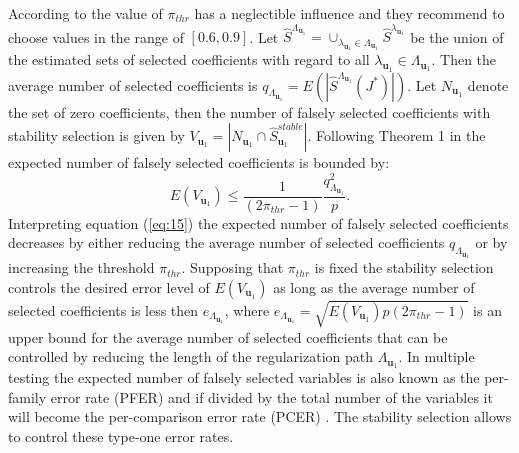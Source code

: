According to \citet{Meinshausen2010} the value of $\pi_{thr}$ has a neglectible influence and they recommend to choose values in the range of $[0.6,0.9]$. Let $\hat{S}^{\Lambda_{\mathbf{u}_{1}}}= \cup_{\lambda_{\mathbf{u}_{1}} \in \Lambda_{\mathbf{u}_{1}}} \hat{S}^{\lambda_{\mathbf{u}_{1}}}$ be
the union of the estimated sets of selected coefficients with regard to all $\lambda_{\mathbf{u}_{1}} \in \Lambda_{\mathbf{u}_{1}}$.
Then the average number of selected coefficients is $q_{\Lambda_{\mathbf{u}_{1}}}=E(|\hat{S}^{\Lambda_{\mathbf{u}_{1}}}(J^{*})|)$. 
Let $N_{\mathbf{u}_{1}}$ denote the set of zero coefficients, then the number of falsely selected coefficients with stability selection is given by $V_{\mathbf{u}_{1}}=|N_{\mathbf{u}_{1}}\cap\hat{S}_{\mathbf{u}_{1}}^{stable}|$. 
Following Theorem 1 in \citet{Meinshausen2010} the expected number of falsely selected coefficients is bounded by:
\begin{equation}
E(V_{\mathbf{u}_{1}}) \leq \frac{1}{(2\pi_{thr}-1)} \frac{q^{2}_{\Lambda_{\mathbf{u}_{1}}}}{p}.
\label{eq:15}
\end{equation}
Interpreting equation (\ref{eq:15}) the expected number of falsely selected coefficients decreases by either reducing the average number of selected coefficients $q_{\Lambda_{\mathbf{u}_{1}}}$ or by increasing the threshold $\pi_{thr}$. Supposing that $\pi_{thr}$ is fixed the stability selection controls the desired error level of $E(V_{\mathbf{u}_{1}})$ as long as the average number of selected coefficients is less then $e_{\Lambda_{\mathbf{u}_{1}}}$, where $e_{\Lambda_{\mathbf{u}_{1}}} = \sqrt{E(V_{\mathbf{u}_{1}})p(2\pi_{thr}-1)}$ is an upper bound for the average number of selected coefficients that can be controlled by reducing the length of the regularization path $\Lambda_{\mathbf{u}_{1}}$. In multiple testing the expected number of falsely selected variables is also known as the per-family error rate (PFER) and if divided by the total number of the variables it will become the per-comparison error rate (PCER) \cite{Dudoit2003}. The stability selection allows to control these type-one error rates. 

